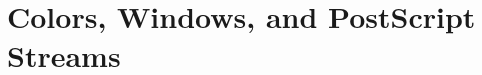 \cleardoublepage
\chapter{Colors, Windows, and PostScript Streams}\label{chapterColors_and_windows}

\medskip








